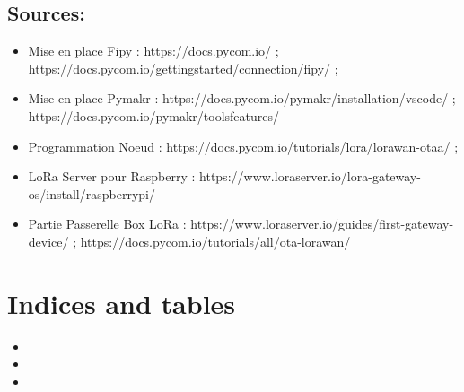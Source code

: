 \documentclass[letterpaper,10pt,french]{sphinxmanual}
\begin{document}
\section{Sources:}
\label{\detokenize{AnnexeA:sources}}\begin{itemize}
\item {} 
Mise en place Fipy : https://docs.pycom.io/ ; https://docs.pycom.io/gettingstarted/connection/fipy/ ;

\item {} 
Mise en place Pymakr : https://docs.pycom.io/pymakr/installation/vscode/ ; https://docs.pycom.io/pymakr/toolsfeatures/

\item {} 
Programmation Noeud : https://docs.pycom.io/tutorials/lora/lorawan-otaa/ ;

\item {} 
LoRa Server pour Raspberry : https://www.loraserver.io/lora-gateway-os/install/raspberrypi/

\item {} 
Partie Passerelle Box LoRa : https://www.loraserver.io/guides/first-gateway-device/ ; https://docs.pycom.io/tutorials/all/ota-lorawan/

\end{itemize}


\chapter{Indices and tables}
\label{\detokenize{index:indices-and-tables}}\begin{itemize}
\item {} 

\item {} 

\item {} 

\end{itemize}



\renewcommand{\indexname}{Index}
\printindex
\end{document}
